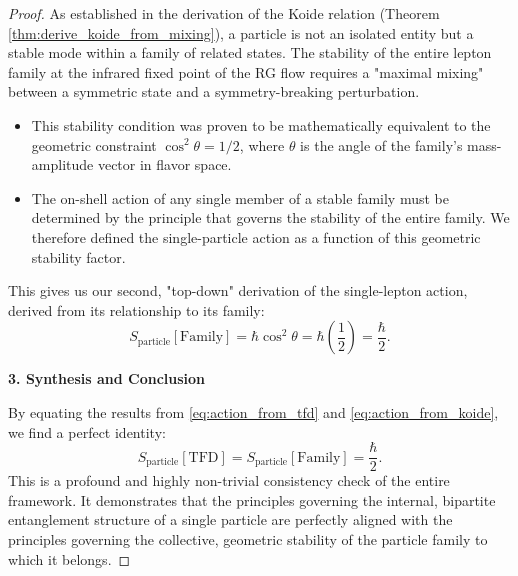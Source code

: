 \documentclass[11pt, letterpaper]{report}
\theoremstyle{plain} %
\theoremstyle{definition} %
\theoremstyle{remark} %
\begin{document}
\begin{proof}
As established in the derivation of the Koide relation (Theorem \ref{thm:derive_koide_from_mixing}), a particle is not an isolated entity but a stable mode within a family of related states. The stability of the entire lepton family at the infrared fixed point of the RG flow requires a "maximal mixing" between a symmetric state and a symmetry-breaking perturbation.
\begin{itemize}
    \item This stability condition was proven to be mathematically equivalent to the geometric constraint $\cos^2\theta = 1/2$, where $\theta$ is the angle of the family's mass-amplitude vector in flavor space.
    \item The on-shell action of any single member of a stable family must be determined by the principle that governs the stability of the entire family. We therefore defined the single-particle action as a function of this geometric stability factor.
\end{itemize}
This gives us our second, "top-down" derivation of the single-lepton action, derived from its relationship to its family:
\begin{equation}
    S_{\text{particle}}[\text{Family}] = \hbar \cos^2\theta = \hbar \left(\frac{1}{2}\right) = \frac{\hbar}{2}.
    \label{eq:action_from_koide}
\end{equation}

\textbf{3. Synthesis and Conclusion}

By equating the results from \cref{eq:action_from_tfd} and \cref{eq:action_from_koide}, we find a perfect identity:
\begin{equation}
    S_{\text{particle}}[\text{TFD}] = S_{\text{particle}}[\text{Family}] = \frac{\hbar}{2}.
\end{equation}
This is a profound and highly non-trivial consistency check of the entire framework. It demonstrates that the principles governing the internal, bipartite entanglement structure of a single particle are perfectly aligned with the principles governing the collective, geometric stability of the particle family to which it belongs.
\end{proof}
\end{document}
